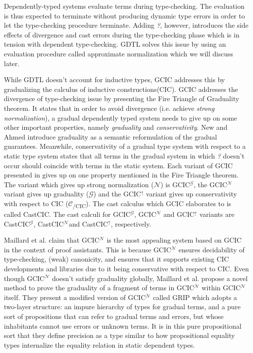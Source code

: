 \documentclass{article}
\newcommand{\Gcode}[1]{{\color{OliveGreen}\textit{#1}}}
\newcommand{\GCICN}[0]{GCIC\(^\mathcal{N}\)}
\newcommand{\GCICG}[0]{GCIC\(^\mathcal{G}\)}
\newcommand{\GCICS}[0]{GCIC\(^\uparrow\)}
\newcommand{\CCICN}[0]{CastCIC\(^\mathcal{N}\)}
\newcommand{\CCICG}[0]{CastCIC\(^\mathcal{G}\)}
\newcommand{\CCICS}[0]{CastCIC\(^\uparrow\)}
\begin{document}
Dependently-typed systems evaluate terms during type-checking. The evaluation is
thus expected to terminate without producing dynamic type errors in order to let
the type-checking procedure terminate. Adding \Gcode{?}, however, introduces the
side effects of divergence and cast errors during the type-checking phase which
is in tension with dependent type-checking. GDTL solves this issue by using an
evaluation procedure called approximate normalization which we will discuss
later.

While GDTL doesn't account for inductive types, GCIC addresses this by
gradualizing the calculus of inductive
constructions(CIC)\cite{coquand_calculus_1988}. GCIC addresses the divergence of
type-checking issue by presenting the Fire Triangle of Graduality theorem. It
states that in order to avoid divergence (i.e. achieve \textit{strong
  normalization}), a gradual dependently typed system needs to give up on some
other important properties, namely \textit{graduality} and
\textit{conservativity}. New and Ahmed\cite{new_graduality_2018} introduce
graduality as a semantic reformulation of the gradual guarantees. Meanwhile,
conservativity of a gradual type system with respect to a static type system
states that all terms in the gradual system in which \Gcode{?} doesn't occur
should coincide with terms in the static system. Each variant of GCIC presented
in \cite{lennon-bertrand_gradualizing_2022} gives up on one property mentioned
in the Fire Triangle theorem. The variant which gives up strong normalization
(\(\mathcal{N}\)) is \GCICG{}, the \GCICN{} variant gives up graduality
(\(\mathcal{G}\)) and the \GCICS{} variant gives up conservativity with respect to
CIC (\(\mathcal{C}\)\textsubscript{/CIC}). The cast calculus which GCIC
elaborates to is called CastCIC. The cast calculi for \GCICG{}, \GCICN{} and \GCICS{}
variants are \CCICG, \CCICN and \CCICS, respectively.

Maillard et al.\cite{maillard_reasonably_2022} claim that \GCICN{} is the most
appealing system based on GCIC in the context of proof assistants. This is
because \GCICN{} ensures decidability of type-checking, (weak) canonicity, and
ensures that it supports existing CIC developments and libraries due to it being
conservative with respect to CIC. Even though \GCICN{} doesn't satisfy
graduality globally, Maillard et al. propose a novel method to prove the
graduality of a fragment of terms in \GCICN{} within \GCICN{} itself. They
present a modified version of \GCICN{} called GRIP which adopts a two-layer
structure: an impure hierarchy of types for gradual terms, and a pure sort of
propositions that can refer to gradual terms and errors, but whose inhabitants
cannot use errors or unknown terms. It is in this pure propositional sort that
they define precision as a type similar to how propositional equality types
internalize the equality relation in static dependent types.
\end{document}

